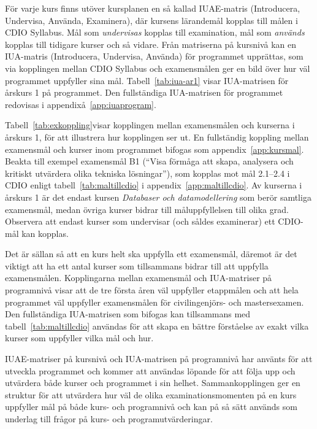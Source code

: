 För varje kurs finns utöver kursplanen en så kallad IUAE-matris (Introducera, Undervisa, Använda, Examinera), där kursens lärandemål kopplas till målen i CDIO Syllabus. Mål som \emph{undervisas} kopplas till examination, mål som \emph{används} kopplas till tidigare kurser och så vidare. Från matriserna på kursnivå kan en IUA-matris (Introducera, Undervisa, Använda) för programmet upprättas, som via kopplingen mellan CDIO Syllabus och examensmålen ger en bild över hur väl programmet uppfyller sina mål. Tabell~\ref{tab:iua-ar1} visar IUA-matrisen för årskurs 1 på programmet. Den fullständiga IUA-matrisen för programmet redovisas i appendixå~\ref{app:iuaprogram}.

Tabell~\ref{tab:exkoppling}visar kopplingen mellan examensmålen och kurserna i årskurs 1, för att illustrera hur kopplingen ser ut. En fullständig koppling mellan examensmål och kurser inom programmet bifogas som appendix~\ref{app:kursmal}. Beakta till exempel examensmål B1 (``Visa förmåga att skapa, analysera och kritiskt utvärdera olika tekniska lösningar''), som kopplas mot mål 2.1--2.4 i CDIO enligt tabell~\ref{tab:maltillcdio} i appendix~\ref{app:maltillcdio}. Av kurserna i årskurs 1 är det endast kursen \emph{Databaser och datamodellering} som berör samtliga examensmål, medan övriga kurser bidrar till måluppfyllelsen till olika grad. Observera att endast kurser som undervisar (och såldes examinerar) ett CDIO-mål kan kopplas.

Det är sällan så att en kurs helt ska uppfylla ett examensmål, däremot är det viktigt att ha ett antal kurser som tillsammans bidrar till att uppfylla examensmålen. Kopplingarna mellan examensmål och IUA-matriser på programnivå visar att de tre första åren väl uppfyller etappmålen och att hela programmet väl uppfyller examensmålen för civilingenjörs- och mastersexamen. Den fullständiga IUA-matrisen som bifogas kan tillsammans med tabell~\ref{tab:maltillcdio} användas för att skapa en bättre förståelse av exakt vilka kurser som uppfyller vilka mål och hur.

IUAE-matriser på kursnivå och IUA-matrisen på programnivå har använts för att utveckla programmet och kommer att användas löpande för att följa upp och utvärdera både kurser och programmet i sin helhet. Sammankopplingen ger en struktur för att utvärdera hur väl de olika examinationsmomenten på en kurs uppfyller mål på både kurs- och programnivå och kan på så sätt används som underlag till frågor på kurs- och programutvärderingar.


